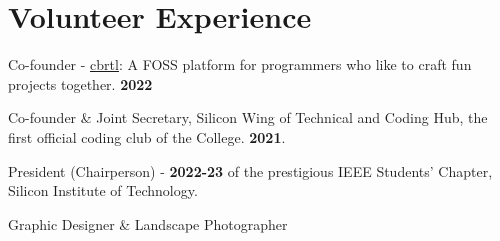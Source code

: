 \documentclass[]{assets/deedy-resume-openfont}
\begin{document}
\section{Volunteer Experience}
\begin{tightemize} 
\item Co-founder - \underline{\href{https://cbrtl.github.io}{cbrtl}}: A FOSS platform for programmers who like to craft fun projects together. \textbf{2022}\\
\item Co-founder \& Joint Secretary, Silicon Wing of Technical and Coding Hub, the first official coding club of the College. \textbf{2021}.\\
\item President (Chairperson) - \textbf{2022-23} of the prestigious IEEE Students’ Chapter, Silicon Institute of Technology.\\
\item Graphic Designer \& Landscape Photographer
\end{tightemize}
\ 
\end{document}
